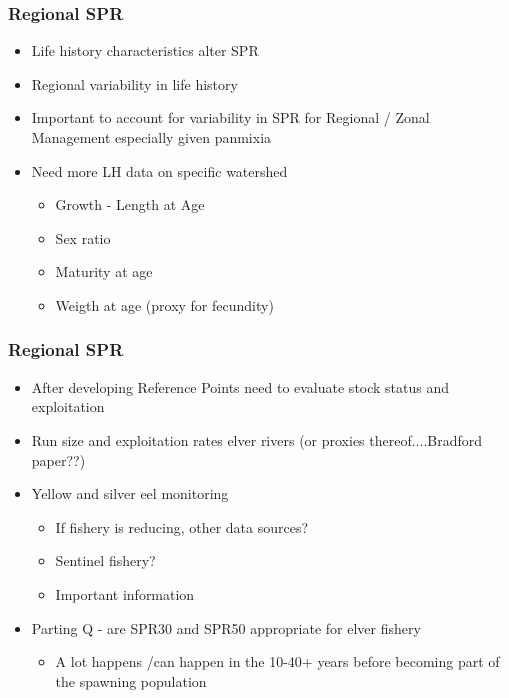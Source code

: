 \documentclass{beamer}
\begin{document}
\begin{frame}
	\frametitle{Regional SPR}
	\begin{itemize}
		\item Life history characteristics alter SPR
		\item Regional variability in life history 
		\item Important to account for variability in SPR for Regional / Zonal Management especially given panmixia
		\item Need more LH data on specific watershed
		\begin{itemize}
			\item Growth - Length at Age
			\item Sex ratio 
			\item Maturity at age
			\item Weigth at age (proxy for fecundity)
		\end{itemize}
		\end{itemize}
\end{frame}

\begin{frame}
	\frametitle{Regional SPR}
	\begin{itemize}
	\item After developing Reference Points need to evaluate stock status and exploitation
		\item Run size and exploitation rates elver rivers (or proxies thereof....Bradford paper??)
		\item Yellow and silver eel monitoring
			\begin{itemize}
				\item If fishery is reducing, other data sources?
				\item Sentinel fishery?
				\item Important information 
			\end{itemize}
		\item Parting Q - are SPR30 and SPR50 appropriate for elver fishery
			\begin{itemize}
				\item A lot happens /can happen in the 10-40+ years before becoming part of the spawning population
			\end{itemize}
	\end{itemize}
\end{frame}
\end{document}
